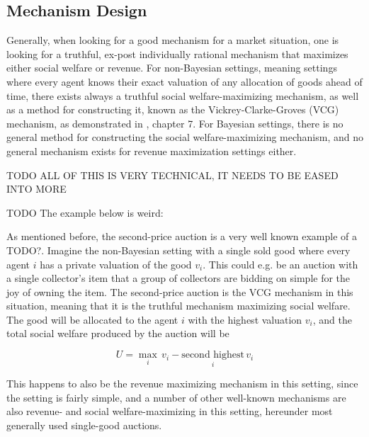 \subsection{Mechanism Design} \label{sec:auction design}

Generally, when looking for a good mechanism for a market situation,
one is looking for a truthful, ex-post individually rational mechanism that
maximizes either social welfare or revenue. For non-Bayesian settings,
meaning settings where every agent knows their exact valuation of any
allocation of goods ahead of time, there exists always a truthful social
welfare-maximizing mechanism, as well as a method for constructing it, known as
the Vickrey-Clarke-Groves (VCG) mechanism, as demonstrated in
\cite{algo_game_theory}, chapter 7. For Bayesian settings, there is no
general method for constructing the social welfare-maximizing mechanism, and no
general mechanism exists for revenue maximization settings either.

TODO ALL OF THIS IS VERY TECHNICAL, IT NEEDS TO BE EASED INTO MORE

TODO The example below is weird:

As mentioned before, the second-price auction is a very well known example of
a TODO?. Imagine the non-Bayesian setting with a single sold good
where every agent $i$ has a private valuation of the good $v_i$. This could
e.g. be an auction with a single collector's item that a group of collectors
are bidding on simple for the joy of owning the item. The second-price auction
is the VCG mechanism in this situation, meaning that it is the truthful
mechanism maximizing social welfare. The good will be allocated to the agent
$i$ with the highest valuation $v_i$, and the total social welfare produced by
the auction will be

\begin{equation}
    U = \underset{i}{\max} \, v_i - \underset{i}{\text{second highest}} \, v_i
\end{equation}

This happens to also be the revenue maximizing mechanism in this setting, since
the setting is fairly simple, and a number of other well-known mechanisms are
also revenue- and social welfare-maximizing in this setting, hereunder most
generally used single-good auctions. %



